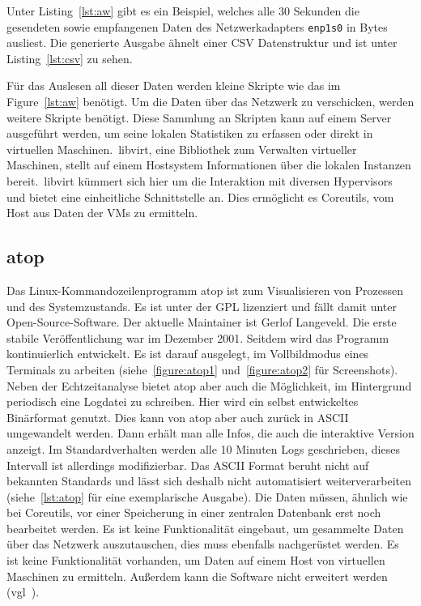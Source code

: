Unter Listing~\ref{lst:aw} gibt es ein Beispiel, welches alle 30 Sekunden die
gesendeten sowie empfangenen Daten des Netzwerkadapters \texttt{enp1s0} in
Bytes ausliest. Die generierte Ausgabe ähnelt einer \gls{CSV} Datenstruktur und
ist unter Listing~\ref{lst:csv} zu sehen.

Für das Auslesen all dieser Daten werden kleine Skripte wie das im
Figure~\ref{lst:aw} benötigt. Um die Daten über das Netzwerk zu verschicken,
werden weitere Skripte benötigt. Diese Sammlung an Skripten kann auf einem
Server ausgeführt werden, um seine lokalen Statistiken zu erfassen oder direkt
in virtuellen Maschinen.\ libvirt, eine Bibliothek zum Verwalten virtueller
Maschinen, stellt auf einem Hostsystem Informationen über die lokalen Instanzen
bereit.\ libvirt kümmert sich hier um die Interaktion mit diversen Hypervisors
und bietet eine einheitliche Schnittstelle an. Dies ermöglicht es Coreutils,
vom Host aus Daten der VMs zu ermitteln.
\tm%

\subsection{atop}
Das Linux-Kommandozeilenprogramm atop ist zum Visualisieren von Prozessen und
des Systemzustands. Es ist unter der GPL lizenziert und fällt damit unter
Open-Source-Software. Der aktuelle \gls{Maintainer} ist Gerlof Langeveld.  Die
erste stabile Veröffentlichung war im Dezember 2001. Seitdem wird das Programm
kontinuierlich entwickelt. Es ist darauf ausgelegt, im Vollbildmodus eines
Terminals zu arbeiten (siehe~\ref{figure:atop1} und~\ref{figure:atop2} für
Screenshots). Neben der Echtzeitanalyse bietet atop aber auch die Möglichkeit,
im Hintergrund periodisch eine Logdatei zu schreiben. Hier wird ein selbst
entwickeltes Binärformat genutzt. Dies kann von atop aber auch zurück in ASCII
umgewandelt werden. Dann erhält man alle Infos, die auch die interaktive
Version anzeigt. Im Standardverhalten werden alle 10 Minuten Logs geschrieben,
dieses Intervall ist allerdings modifizierbar. Das ASCII Format beruht nicht
auf bekannten Standards und lässt sich deshalb nicht automatisiert
weiterverarbeiten (siehe~\ref{lst:atop} für eine exemplarische Ausgabe). Die
Daten müssen, ähnlich wie bei Coreutils, vor einer Speicherung in einer
zentralen Datenbank erst noch bearbeitet werden. Es ist keine Funktionalität
eingebaut, um gesammelte Daten über das Netzwerk auszutauschen, dies muss
ebenfalls nachgerüstet werden. Es ist keine Funktionalität vorhanden, um Daten
auf einem Host von virtuellen Maschinen zu ermitteln. Außerdem kann die
Software nicht erweitert werden (vgl~\cite{atop}).
\tm%

